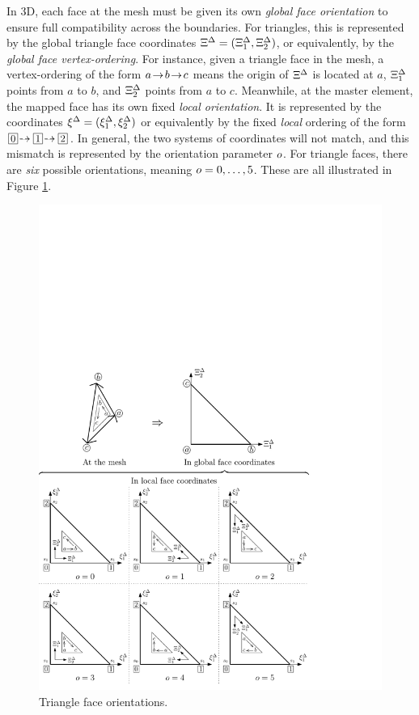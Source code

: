 In 3D, each face at the mesh must be given its own \textit{global face orientation} to ensure full compatibility across the boundaries.
For triangles, this is represented by the global triangle face coordinates $\Xi^\Delta=(\Xi_1^\Delta,\Xi_2^\Delta)$, or equivalently, by the \textit{global face vertex-ordering}.
For instance, given a triangle face in the mesh, a vertex-ordering of the form $a\!\to\! b\!\to\! c$ means the origin of $\Xi^\Delta$ is located at $a$, $\Xi_1^\Delta$ points from $a$ to $b$, and $\Xi_2^\Delta$ points from $a$ to $c$.
Meanwhile, at the master element, the mapped face has its own fixed \textit{local orientation}.
It is represented by the coordinates $\xi^\Delta=(\xi_1^\Delta,\xi_2^\Delta)$ or equivalently by the fixed \textit{local} ordering of the form $\boxednum{0}\!\tdashto\boxednum{1}\!\tdashto\boxednum{2}$.
In general, the two systems of coordinates will not match, and this mismatch is represented by the orientation parameter $o$.
For triangle faces, there are \textit{six} possible orientations, meaning $o=0,\ldots,5$.
These are all illustrated in Figure \ref{fig:OrientationsTri}.

\begin{figure}[!ht]
\begin{center}
\includegraphics[scale=0.75]{./figures/OrientationsTriangle.pdf}
\caption{Triangle face orientations.}
\label{fig:OrientationsTri}
\end{center}
\end{figure}

